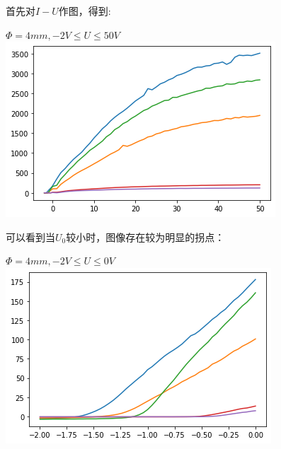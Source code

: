 \documentclass[a4paper]{ltxdoc}
\newenvironment{Figure}
  {\par\medskip\noindent\minipage{\linewidth}}
  {\endminipage\par\medskip}
\begin{document}
\begin{multicols}{2}
\begin{itemize}
              首先对$I-U$作图，得到:
              \begin{Figure}
                  \centering
                  $\Phi = 4mm, -2V\leq U\leq 50V$
                  \includegraphics[width=\linewidth]{img/7.png}
              \end{Figure}

              可以看到当$U_0$较小时，图像存在较为明显的拐点：
              \begin{Figure}
                  \centering
                  $\Phi = 4mm, -2V\leq U\leq 0V$
                  \includegraphics[width=\linewidth]{img/8.png}
              \end{Figure}


\end{itemize}
\end{multicols}
\end{document}

